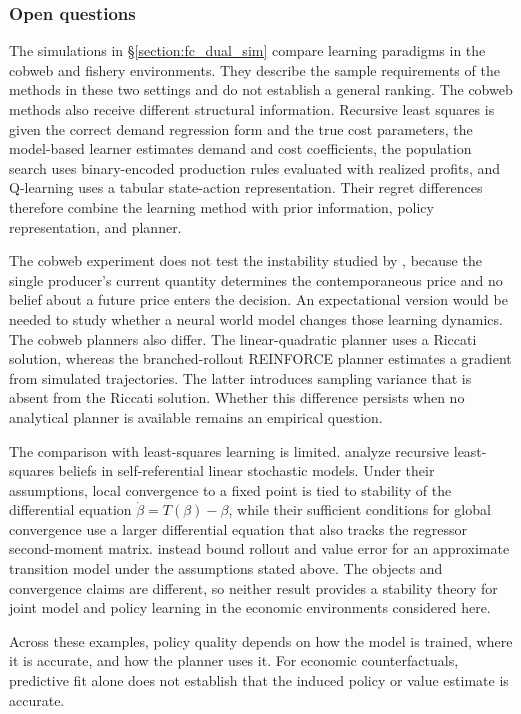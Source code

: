 \subsubsection{Open questions}
\label{section:fc_synthesis_open}

The simulations in \S\ref{section:fc_dual_sim} compare learning paradigms in the cobweb and fishery environments. They describe the sample requirements of the methods in these two settings and do not establish a general ranking. The cobweb methods also receive different structural information. Recursive least squares is given the correct demand regression form and the true cost parameters, the model-based learner estimates demand and cost coefficients, the population search uses binary-encoded production rules evaluated with realized profits, and Q-learning uses a tabular state-action representation. Their regret differences therefore combine the learning method with prior information, policy representation, and planner.

The cobweb experiment does not test the instability studied by \citet{MarcetSargent1989}, because the single producer's current quantity determines the contemporaneous price and no belief about a future price enters the decision. An expectational version would be needed to study whether a neural world model changes those learning dynamics. The cobweb planners also differ. The linear-quadratic planner uses a Riccati solution, whereas the branched-rollout REINFORCE planner estimates a gradient from simulated trajectories. The latter introduces sampling variance that is absent from the Riccati solution. Whether this difference persists when no analytical planner is available remains an empirical question.

The comparison with least-squares learning is limited. \citet{MarcetSargent1989} analyze recursive least-squares beliefs in self-referential linear stochastic models. Under their assumptions, local convergence to a fixed point is tied to stability of the differential equation $\dot{\beta}=T(\beta)-\beta$, while their sufficient conditions for global convergence use a larger differential equation that also tracks the regressor second-moment matrix. \citet{Asadi2018Lipschitz} instead bound rollout and value error for an approximate transition model under the assumptions stated above. The objects and convergence claims are different, so neither result provides a stability theory for joint model and policy learning in the economic environments considered here.

Across these examples, policy quality depends on how the model is trained, where it is accurate, and how the planner uses it. For economic counterfactuals, predictive fit alone does not establish that the induced policy or value estimate is accurate.
